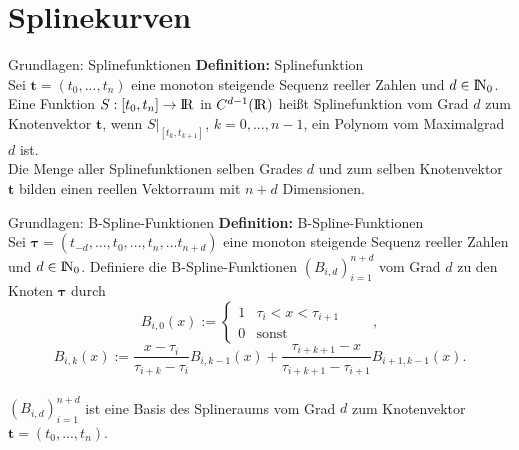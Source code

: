 \section{Splinekurven} {

\begin{frame}{Grundlagen: Splinefunktionen}
\textbf{Definition:} Splinefunktion \\
Sei $\mathbf{t}=(t_0,...,t_n)$ eine monoton steigende Sequenz reeller Zahlen und $d \in {\rm I\!N}_0$. Eine Funktion $S:[t_0,t_n] \rightarrow {\rm I\!R}$ in $C^{d-1}({\rm I\!R})$ heißt Splinefunktion vom Grad $d$ zum Knotenvektor $\mathbf{t}$, wenn $S|_{[t_{k},t_{k+1}]}$, $k=0,...,n-1$, ein Polynom vom Maximalgrad $d$ ist. 
\\[1.0cm]

\pause
Die Menge aller Splinefunktionen selben Grades $d$ und zum selben Knotenvektor $\mathbf{t}$ bilden einen reellen Vektorraum mit $n+d$ Dimensionen. 
\\
\end{frame}

\begin{frame}{Grundlagen: B-Spline-Funktionen}
\textbf{Definition:} B-Spline-Funktionen \\
Sei $\mathbf{\tau}=(t_{-d},...,t_0,...,t_n,...t_{n+d})$ eine monoton steigende Sequenz reeller Zahlen und $d \in {\rm I\!N}_0$. Definiere die B-Spline-Funktionen $(B_{i,d})_{i=1}^{n+d}$ vom Grad $d$ zu den Knoten $\mathbf{\tau}$ durch 
\[
B_{i,0}(x) := \begin{cases} 1& \tau_i<x<\tau_{i+1} \\ 0& \text{sonst} \end{cases} \qquad ,
\]
\[
B_{i,k}(x) := \frac{x-\tau_i}{\tau_{i+k}-\tau_i}B_{i,k-1}(x) + \frac{\tau_{i+k+1}-x}{\tau_{i+k+1}-\tau_{i+1}}B_{i+1,k-1}(x)
.
\]
\\[1.0cm]

$(B_{i,d})_{i=1}^{n+d}$ ist eine Basis des Splineraums vom Grad $d$ zum Knotenvektor $\mathbf{t}=(t_0,...,t_n)$.
\\
\end{frame}

}
